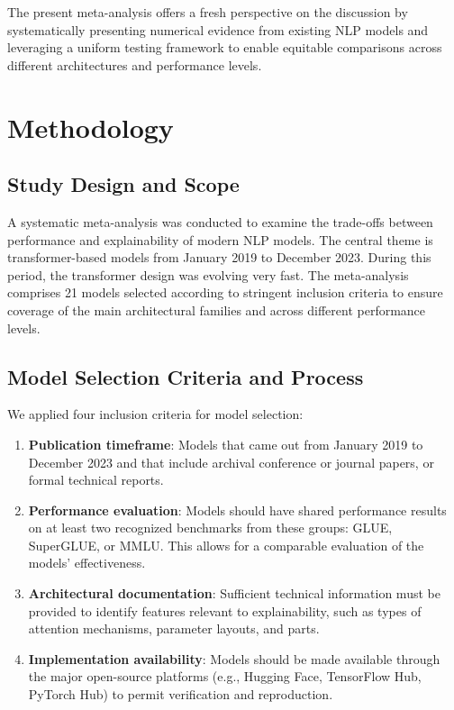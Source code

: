 \documentclass[preprint,12pt]{elsarticle}
\begin{document}
The present meta-analysis offers a fresh perspective on the discussion by systematically presenting numerical evidence from existing NLP models and leveraging a uniform testing framework to enable equitable comparisons across different architectures and performance levels.

\section{Methodology}
\label{sec:methods}

\subsection{Study Design and Scope}
A systematic meta-analysis was conducted to examine the trade-offs between performance and explainability of modern NLP models. The central theme is transformer-based models from January 2019 to December 2023. During this period, the transformer design was evolving very fast. The meta-analysis comprises 21 models selected according to stringent inclusion criteria to ensure coverage of the main architectural families and across different performance levels.

\subsection{Model Selection Criteria and Process}
We applied four inclusion criteria for model selection:

\begin{enumerate}
    \item \textbf{ Publication timeframe}: Models that came out from January 2019 to December 2023 and that include archival conference or journal papers, or formal technical reports.

    \item \textbf{Performance evaluation}: Models should have shared performance results on at least two recognized benchmarks from these groups: GLUE, SuperGLUE, or MMLU. This allows for a comparable evaluation of the models' effectiveness.

    \item \textbf{Architectural documentation}: Sufficient technical information must be provided to identify features relevant to explainability, such as types of attention mechanisms, parameter layouts, and parts.

   \item \textbf{Implementation availability}: Models should be made available through the major open-source platforms (e.g., Hugging Face, TensorFlow Hub, PyTorch Hub) to permit verification and reproduction.
\end{enumerate}
\end{document}
